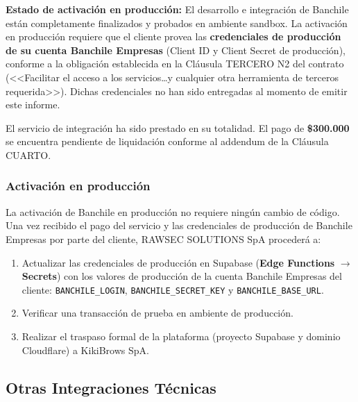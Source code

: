\documentclass[a4paper,11pt]{article}
\begin{document}
\begin{warnbox}
\textbf{Estado de activaci\'on en producci\'on:} El desarrollo e integraci\'on de Banchile
est\'an completamente finalizados y probados en ambiente sandbox. La activaci\'on en
producci\'on requiere que el cliente provea las \textbf{credenciales de producci\'on de su
cuenta Banchile Empresas} (Client ID y Client Secret de producci\'on), conforme a la
obligaci\'on establecida en la Cl\'ausula TERCERO N\textdegree{}2 del contrato
(<<Facilitar el acceso a los servicios\ldots y cualquier otra herramienta de terceros
requerida>>). Dichas credenciales no han sido entregadas al momento de emitir este informe.

\medskip
El servicio de integraci\'on ha sido prestado en su totalidad. El pago de
\textbf{\$300.000} se encuentra pendiente de liquidaci\'on conforme al addendum
de la Cl\'ausula CUARTO.
\end{warnbox}

\subsubsection{Activaci\'on en producci\'on}

La activaci\'on de Banchile en producci\'on no requiere ning\'un cambio de
c\'odigo. Una vez recibido el pago del servicio y las credenciales de
producci\'on de Banchile Empresas por parte del cliente, RAWSEC SOLUTIONS SpA
proceder\'a a:

\begin{enumerate}[leftmargin=1.8em, itemsep=4pt]
  \item Actualizar las credenciales de producci\'on en Supabase
        (\textbf{Edge Functions} $\rightarrow$ \textbf{Secrets}) con los
        valores de producci\'on de la cuenta Banchile Empresas del cliente:
        \texttt{BANCHILE\_LOGIN}, \texttt{BANCHILE\_SECRET\_KEY} y
        \texttt{BANCHILE\_BASE\_URL}.
  \item Verificar una transacci\'on de prueba en ambiente de producci\'on.
  \item Realizar el traspaso formal de la plataforma
        (proyecto Supabase y dominio Cloudflare) a KikiBrows SpA.
\end{enumerate}

\subsection{Otras Integraciones T\'ecnicas}
\end{document}
